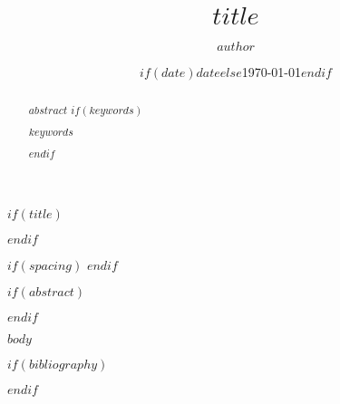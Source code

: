 \documentclass[$if(fontsize)$$fontsize$$else$11pt$endif$$if(titlepage)$, titlepage$endif$$if(prelim)$, prelim$endif$$if(nologo)$, nologo$endif$$if(nocopyright)$, nocopyright$endif$$if(nofunding)$, nofunding$endif$$if(twoside)$, twoside$endif$]{article}
\title{$title$}
\author{$author$}
\date{$if(date)$$date$$else$\today$endif$}
\begin{document}
$if(title)$
\maketitle
$endif$

$if(spacing)$
$endif$

$if(abstract)$
\begin{abstract}
$abstract$
$if(keywords)$
\begin{keywords}$keywords$\end{keywords}
$endif$
\end{abstract}
$endif$

$body$

$if(bibliography)$


$endif$
\end{document}
